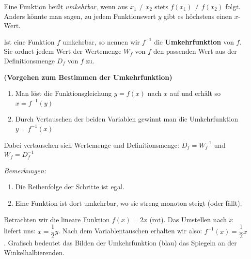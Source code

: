 \documentclass[ngerman, 12pt]{nssheetxea}
\begin{document}
\begin{definition}
Eine Funktion heißt \textit{umkehrbar}, wenn aus $x_1 \neq x_2$ stets $f(x_1) \neq f(x_2)$ folgt. Anders könnte man sagen, zu jedem Funktionswert $y$ gibt es höchstens einen $x$-Wert. \par
Ist eine Funktion $f$ umkehrbar, so nennen wir $f^{-1}$ die \textbf{Umkehrfunktion} von $f$. Sie ordnet jedem Wert der Wertemenge $W_f$ von $f$ den passenden Wert aus der Definitionsmenge $D_f$ von $f$ zu.
 
\end{definition}

\begin{theorem}
\textbf{(Vorgehen zum Bestimmen der Umkehrfunktion)}
\begin{enumerate}
\item Man löst die Funktionsgleichung $y=f(x)$ nach $x$ auf und erhält so $x=f^{-1}(y)$
\item Durch Vertauschen der beiden Variablen gewinnt man die Umkehrfunktion $y=f^{-1}(x)$
\end{enumerate}
Dabei vertauschen sich Wertemenge und Definitionsmenge: $D_f=W_f^{-1}$ und $W_f=D_f^{-1}$ \par
\textit{Bemerkungen:}
\begin{enumerate}[(1)]
\item Die Reihenfolge der Schritte ist egal.
\item Eine Funktion ist dort umkehrbar, wo sie streng monoton steigt (oder fällt).
\end{enumerate}
\end{theorem}

\begin{example}
Betrachten wir die lineare Funktion $f(x)=2x$ (rot). Das Umstellen nach $x$ liefert uns: $x=\dfrac{1}{2}y$. Nach dem Variablentauschen erhalten wir also: $f^{-1}(x)=\dfrac{1}{2}x$. Grafisch bedeutet das Bilden der Umkehrfunktion (blau) das Spiegeln an der Winkelhalbierenden.


\begin{center}
\end{center}
\end{example}
\end{document}
